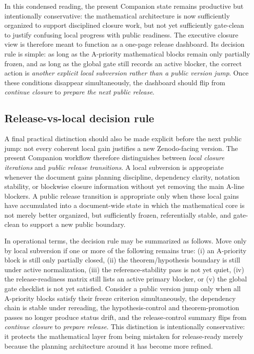 \documentclass[12pt,a4paper]{article}
\begin{document}
In this condensed reading, the present Companion state remains productive but intentionally conservative: the mathematical architecture is now sufficiently organized to support disciplined closure work, but not yet sufficiently gate-clean to justify confusing local progress with public readiness. The executive closure view is therefore meant to function as a one-page release dashboard. Its decision rule is simple: as long as the A-priority mathematical blocks remain only partially frozen, and as long as the global gate still records an active blocker, the correct action is \emph{another explicit local subversion rather than a public version jump}. Once these conditions disappear simultaneously, the dashboard should flip from \emph{continue closure} to \emph{prepare the next public release}.


\subsection*{Release-vs-local decision rule}
A final practical distinction should also be made explicit before the next public jump: not every coherent local gain justifies a new Zenodo-facing version. The present Companion workflow therefore distinguishes between \emph{local closure iterations} and \emph{public release transitions}. A local subversion is appropriate whenever the document gains planning discipline, dependency clarity, notation stability, or blockwise closure information without yet removing the main A-line blockers. A public release transition is appropriate only when these local gains have accumulated into a document-wide state in which the mathematical core is not merely better organized, but sufficiently frozen, referentially stable, and gate-clean to support a new public boundary.

In operational terms, the decision rule may be summarized as follows. Move only by local subversion if one or more of the following remains true: (i) an A-priority block is still only partially closed, (ii) the theorem/hypothesis boundary is still under active normalization, (iii) the reference-stability pass is not yet quiet, (iv) the release-readiness matrix still lists an active primary blocker, or (v) the global gate checklist is not yet satisfied. Consider a public version jump only when all A-priority blocks satisfy their freeze criterion simultaneously, the dependency chain is stable under rereading, the hypothesis-control and theorem-promotion passes no longer produce status drift, and the release-control summary flips from \emph{continue closure} to \emph{prepare release}. This distinction is intentionally conservative: it protects the mathematical layer from being mistaken for release-ready merely because the planning architecture around it has become more refined.
\end{document}
